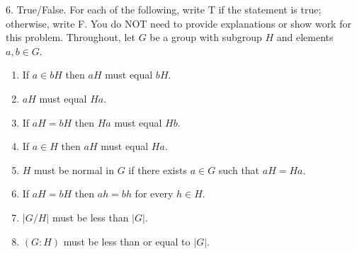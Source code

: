 \documentclass[10pt,]{book}
\theoremstyle{plain}
\theoremstyle{definition}
\theoremstyle{definition}
\theoremstyle{definition}
\theoremstyle{definition}
\numberwithin{equation}{section}
\begin{document}
\begin{exerciselist}
\item[6.]\hypertarget{exercise-55}{}
        True/False. For each of the following, write T if the statement is
        true; otherwise, write F. You do NOT need to provide explanations or show work for this problem. Throughout, let \(G\) be a group with subgroup \(H\) and elements \(a,b\in G\).
        \leavevmode%
\begin{enumerate}[label=(\alph*)]
\item\hypertarget{li-461}{}
              If \(a\in bH\) then \(aH\) must equal \(bH\).
\item\hypertarget{li-462}{}
              \(aH\) must equal \(Ha\).
\item\hypertarget{li-463}{}
              If \(aH=bH\) then \(Ha\) must equal \(Hb\).
\item\hypertarget{li-464}{}
              If \(a\in H\) then \(aH\) must equal \(Ha\).
\item\hypertarget{li-465}{}
              \(H\) must be normal in \(G\) if there exists \(a\in G\) such that \(aH=Ha\).
\item\hypertarget{li-466}{}
              If \(aH=bH\) then \(ah=bh\) for every \(h\in H\).
\item\hypertarget{li-467}{}
              \(|G/H|\) must be less than \(|G|\).
\item\hypertarget{li-468}{}
              \((G:H)\) must be less than or equal to \(|G|\).
\end{enumerate}


\end{exerciselist}
\end{document}
